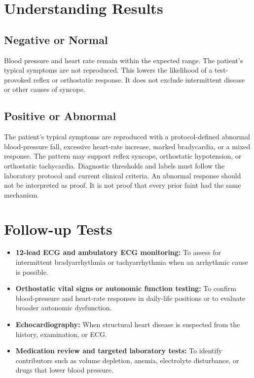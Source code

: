 \section*{Understanding Results}

\subsection*{Negative or Normal}
Blood pressure and heart rate remain within the expected range. The patient's typical symptoms are not reproduced. This lowers the likelihood of a test-provoked reflex or orthostatic response. It does not exclude intermittent disease or other causes of syncope.

\subsection*{Positive or Abnormal}
The patient's typical symptoms are reproduced with a protocol-defined abnormal blood-pressure fall, excessive heart-rate increase, marked bradycardia, or a mixed response. The pattern may support reflex syncope, orthostatic hypotension, or orthostatic tachycardia. Diagnostic thresholds and labels must follow the laboratory protocol and current clinical criteria. An abnormal response should not be interpreted as proof. It is not proof that every prior faint had the same mechanism.

\section*{Follow-up Tests}
\begin{itemize}
  \item \textbf{12-lead ECG and ambulatory ECG monitoring:} To assess for intermittent bradyarrhythmia or tachyarrhythmia when an arrhythmic cause is possible.
  \item \textbf{Orthostatic vital signs or autonomic function testing:} To confirm blood-pressure and heart-rate responses in daily-life positions or to evaluate broader autonomic dysfunction.
  \item \textbf{Echocardiography:} When structural heart disease is suspected from the history, examination, or ECG.
  \item \textbf{Medication review and targeted laboratory tests:} To identify contributors such as volume depletion, anemia, electrolyte disturbance, or drugs that lower blood pressure.
\end{itemize}

